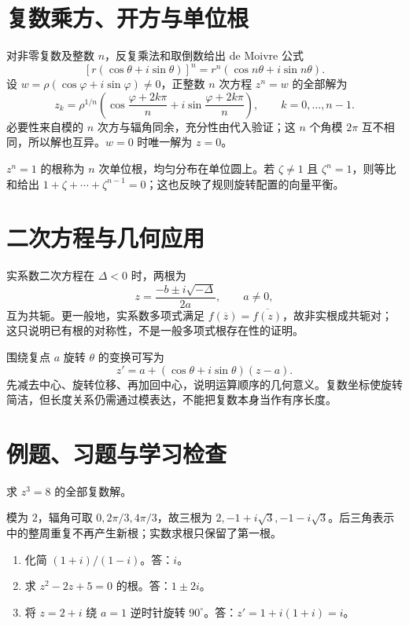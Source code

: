 \section{复数乘方、开方与单位根}
对非零复数及整数 $n$，反复乘法和取倒数给出 de Moivre 公式
\[
 [r(\cos\theta+i\sin\theta)]^n
 =r^n(\cos n\theta+i\sin n\theta).
\]
设 $w=\rho(\cos\varphi+i\sin\varphi)\ne0$，正整数 $n$ 次方程 $z^n=w$ 的全部解为
\[
 z_k=\rho^{1/n}\left(\cos\frac{\varphi+2k\pi}{n}
       +i\sin\frac{\varphi+2k\pi}{n}\right),
 \qquad k=0,\ldots,n-1.
\]
必要性来自模的 $n$ 次方与辐角同余，充分性由代入验证；这 $n$ 个角模 $2\pi$ 互不相同，所以解也互异。$w=0$ 时唯一解为 $z=0$。

$z^n=1$ 的根称为 $n$ 次单位根，均匀分布在单位圆上。若 $\zeta\ne1$ 且 $\zeta^n=1$，则等比和给出 $1+\zeta+\cdots+\zeta^{n-1}=0$；这也反映了规则旋转配置的向量平衡。

\section{二次方程与几何应用}
实系数二次方程在 $\Delta<0$ 时，两根为
\[
 z=\frac{-b\pm i\sqrt{-\Delta}}{2a},\qquad a\ne0,
\]
互为共轭。更一般地，实系数多项式满足 $f(\overline z)=\overline{f(z)}$，故非实根成共轭对；这只说明已有根的对称性，不是一般多项式根存在性的证明。

围绕复点 $a$ 旋转 $\theta$ 的变换可写为
\[
 z'=a+(\cos\theta+i\sin\theta)(z-a).
\]
先减去中心、旋转位移、再加回中心，说明运算顺序的几何意义。复数坐标使旋转简洁，但长度关系仍需通过模表达，不能把复数本身当作有序长度。

\section{例题、习题与学习检查}
\begin{example}
求 $z^3=8$ 的全部复数解。
\end{example}
\begin{solve}
模为 $2$，辐角可取 $0,2\pi/3,4\pi/3$，故三根为 $2,-1+i\sqrt3,-1-i\sqrt3$。后三角表示中的整周重复不再产生新根；实数求根只保留了第一根。
\end{solve}
\begin{enumerate}
\item 化简 $(1+i)/(1-i)$。答：$i$。
\item 求 $z^2-2z+5=0$ 的根。答：$1\pm2i$。
\item 将 $z=2+i$ 绕 $a=1$ 逆时针旋转 $90^\circ$。答：$z'=1+i(1+i)=i$。
\end{enumerate}

